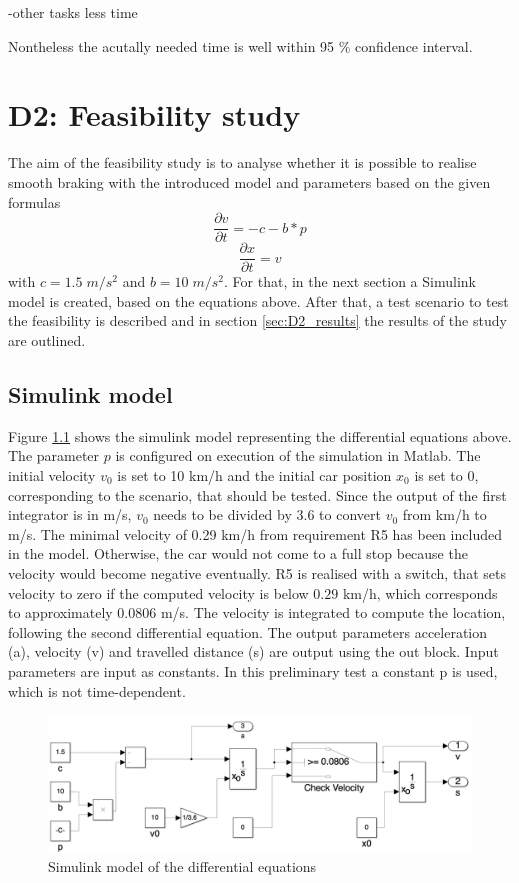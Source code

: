 -other tasks less time

Nontheless the acutally needed time is well within 95 \% confidence interval. 



\chapter{D2: Feasibility study}\label{cha:D2}
The aim of the feasibility study is to analyse whether it is possible to realise smooth braking with the introduced model and parameters based on the given formulas
\begin{equation}
	\frac{\partial v}{\partial t} = -c-b*p
\end{equation}
\begin{equation}
	\frac{\partial x}{\partial t} = v
\end{equation}
with $c = 1.5\; m/s^2$ and $b = 10\; m/s^2$.
For that, in the next section a Simulink model is created, based on the equations above.
After that, a test scenario to test the feasibility is described and in section \ref{sec:D2_results} the results of the study are outlined.

\section{Simulink model}\label{sec:D2_model}
Figure \ref{fig:D2_Sim} shows the simulink model representing the differential equations above.
The parameter $p$ is configured on execution of the simulation in Matlab.
The initial velocity $v_0$ is set to 10 km/h and the initial car position $x_0$ is set to 0, corresponding to the scenario, that should be tested.
Since the output of the first integrator is in m/s, $v_0$ needs to be divided by $3.6$ to convert $v_0$ from km/h to m/s.
The minimal velocity of 0.29 km/h from requirement R5 has been included in the model.
Otherwise, the car would not come to a full stop because the velocity would become negative eventually.
R5 is realised with a switch, that sets velocity to zero if the computed velocity is below $0.29$ km/h, which corresponds to approximately $0.0806$ m/s.
The velocity is integrated to compute the location, following the second differential equation.
The output parameters acceleration (a), velocity (v) and travelled distance (s) are output using the out block.
Input parameters are input as constants.
In this preliminary test a constant p is used, which is not time-dependent.
\begin{figure}[H]
\centering
\includegraphics[width=1\textwidth]{images/D2_sim.png}
\caption{Simulink model of the differential equations}
\label{fig:D2_Sim}
\end{figure}

